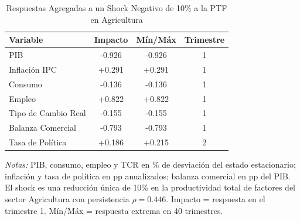 \begin{table}[htbp]
\centering
\caption{Respuestas Agregadas a un Shock Negativo de 10\% a la PTF en Agricultura}
\label{tab:agr_agg}
\begin{threeparttable}
\begin{tabular}{@{}l c c c@{}}
\toprule
Variable & Impacto & Mín/Máx & Trimestre \\
\midrule
PIB & -0.926 & -0.926 & 1 \\
Inflación IPC & +0.291 & +0.291 & 1 \\
Consumo & -0.136 & -0.136 & 1 \\
Empleo & +0.822 & +0.822 & 1 \\
Tipo de Cambio Real & -0.155 & -0.155 & 1 \\
Balanza Comercial & -0.793 & -0.793 & 1 \\
Tasa de Política & +0.186 & +0.215 & 2 \\
\bottomrule
\end{tabular}
\begin{tablenotes}[flushleft]
\footnotesize
\item \textit{Notas:} PIB, consumo, empleo y TCR en \% de desviación del estado estacionario; inflación y tasa de política en pp anualizados; balanza comercial en pp del PIB. El shock es una reducción única de 10\% en la productividad total de factores del sector Agricultura con persistencia $\rho = 0.446$. Impacto = respuesta en el trimestre 1. Mín/Máx = respuesta extrema en 40 trimestres.
\end{tablenotes}
\end{threeparttable}
\end{table}
